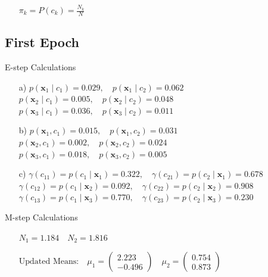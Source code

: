 \documentclass[12pt]{article}
\begin{document}
\begin{enumerate}[leftmargin=0pt, label=\textbf{\arabic*.)}]
\begin{enumerate}
              \item[]
                    $\pi_k = P(c_k) = \frac{N_k}{N}$
          \end{enumerate}

          \subsection*{First Epoch}
          E-step Calculations \\
          \begin{enumerate}
              \item[a)]
                    $p(\mathbf{x}_1 \mid c_1) = 0.029, \quad p(\mathbf{x}_1 \mid c_2) = 0.062$ \\
                    $p(\mathbf{x}_2 \mid c_1) = 0.005, \quad p(\mathbf{x}_2 \mid c_2) = 0.048$ \\
                    $p(\mathbf{x}_3 \mid c_1) = 0.036, \quad p(\mathbf{x}_3 \mid c_2) = 0.011$

              \item[b)]
                    $p(\mathbf{x}_1, c_1) = 0.015, \quad p(\mathbf{x}_1, c_2) = 0.031$ \\
                    $p(\mathbf{x}_2, c_1) = 0.002, \quad p(\mathbf{x}_2, c_2) = 0.024$ \\
                    $p(\mathbf{x}_3, c_1) = 0.018, \quad p(\mathbf{x}_3, c_2) = 0.005$

              \item[c)]
                    $\gamma(c_{11}) = p(c_1 \mid \mathbf{x}_1) = 0.322, \quad \gamma(c_{21}) = p(c_2 \mid \mathbf{x}_1) = 0.678$ \\
                    $\gamma(c_{12}) = p(c_1 \mid \mathbf{x}_2) = 0.092, \quad \gamma(c_{22}) = p(c_2 \mid \mathbf{x}_2) = 0.908$ \\
                    $\gamma(c_{13}) = p(c_1 \mid \mathbf{x}_3) = 0.770, \quad \gamma(c_{23}) = p(c_2 \mid \mathbf{x}_3) = 0.230$
          \end{enumerate}

          M-step Calculations \\
          \begin{enumerate}
              \item[]
                    $N_1 = 1.184  \quad N_2 = 1.816$ \\

              \item[]
                    $\text{Updated Means:} \quad \mu_1 = \begin{pmatrix} 2.223 \\ -0.496 \end{pmatrix} \quad \mu_2 = \begin{pmatrix} 0.754 \\ 0.873 \end{pmatrix}$ \\


\end{enumerate}
\end{enumerate}
\end{document}
